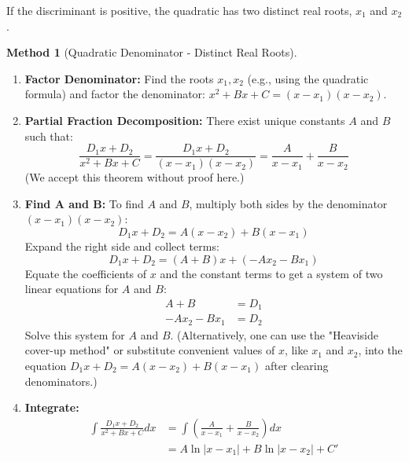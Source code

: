 \documentclass[11pt]{article}
\theoremstyle{plain}
\theoremstyle{definition}
\newtheorem{method}[theorem]{Method}
\theoremstyle{remark}
\newcommand{\abs}[1]{\left|#1\right|}
\begin{document}
If the discriminant is positive, the quadratic has two distinct real roots, $x_1$ and $x_2$.

\begin{method}[Quadratic Denominator - Distinct Real Roots]
\leavevmode
\begin{enumerate}
    \item \textbf{Factor Denominator:} Find the roots $x_1, x_2$ (e.g., using the quadratic formula) and factor the denominator: $x^2+Bx+C = (x-x_1)(x-x_2)$.
    \item \textbf{Partial Fraction Decomposition:} There exist unique constants $A$ and $B$ such that:
    \[ \frac{D_1 x + D_2}{x^2+Bx+C} = \frac{D_1 x + D_2}{(x-x_1)(x-x_2)} = \frac{A}{x-x_1} + \frac{B}{x-x_2} \]
    (We accept this theorem without proof here.)
    \item \textbf{Find A and B:} To find $A$ and $B$, multiply both sides by the denominator $(x-x_1)(x-x_2)$:
    \[ D_1 x + D_2 = A(x-x_2) + B(x-x_1) \]
    Expand the right side and collect terms:
    \[ D_1 x + D_2 = (A+B)x + (-Ax_2 - Bx_1) \]
    Equate the coefficients of $x$ and the constant terms to get a system of two linear equations for $A$ and $B$:
    \begin{align*} A + B &= D_1 \\ -Ax_2 - Bx_1 &= D_2 \end{align*}
    Solve this system for $A$ and $B$. (Alternatively, one can use the "Heaviside cover-up method" or substitute convenient values of $x$, like $x_1$ and $x_2$, into the equation $D_1 x + D_2 = A(x-x_2) + B(x-x_1)$ after clearing denominators.)
    \item \textbf{Integrate:}
    \begin{align*} \int \frac{D_1 x + D_2}{x^2+Bx+C} dx &= \int \left( \frac{A}{x-x_1} + \frac{B}{x-x_2} \right) dx \\ &= A \ln\abs{x-x_1} + B \ln\abs{x-x_2} + C' \end{align*}
\end{enumerate}
\end{method}
\end{document}
